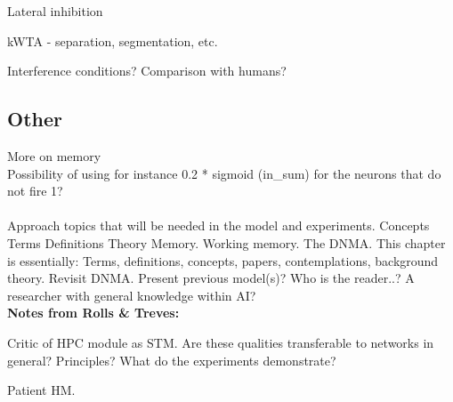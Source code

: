 Lateral inhibition

kWTA - separation, segmentation, etc.

Interference conditions? Comparison with humans?

\subsection*{Other}

More on memory
\\
Possibility of using for instance 0.2 * sigmoid (in\_sum) for the neurons that do not fire 1?
\\\\

Approach topics that will be needed in the model and experiments.
Concepts
Terms
Definitions
Theory
Memory. Working memory.
The DNMA.
This chapter is essentially: Terms, definitions, concepts, papers, contemplations, background theory. Revisit DNMA.
Present previous model(s)?
Who is the reader..? A researcher with general knowledge within AI?
\\

\textbf{Notes from Rolls \& Treves:}

Critic of HPC module as STM. Are these qualities transferable to networks in general? Principles? What do the experiments demonstrate?

Patient HM.

\cleardoublepage